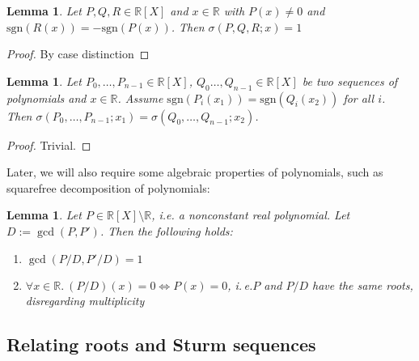 \documentclass[11pt,a4paper,oneside]{article}
\newtheorem{lemma}[definition]{Lemma}
\newcommand{\RR}{\mathbb{R}}
\newcommand{\sgn}{\mathrm{sgn}}
\newcommand{\ie}{i.\,e.\xspace}
\begin{document}
\begin{lemma}\label{thm:sign_changes_triple}
Let $P,Q,R\in\RR[X]$ and $x\in\RR$ with $P(x)\neq 0$ and $\sgn(R(x)) = -\sgn(P(x))$. Then $\sigma(P,Q,R; x) = 1$
\end{lemma}
\begin{proof}
By case distinction
\end{proof}\vskip3mm

\begin{lemma}\label{thm:same_signs}
Let $P_0,\ldots,P_{n-1}\in\RR[X]$, $Q_0\ldots,Q_{n-1}\in\RR[X]$ be two sequences of polynomials and $x\in\RR$. Assume $\sgn(P_i(x_1))=\sgn(Q_i(x_2))$ for all $i$. Then $\sigma(P_0,\ldots,P_{n-1};x_1)=\sigma(Q_0,\ldots,Q_{n-1};x_2)$.
\end{lemma}
\begin{proof}
Trivial.
\end{proof}\vskip3mm

Later, we will also require some algebraic properties of polynomials, such as squarefree decomposition of polynomials:
\begin{lemma}\label{thm:squarefree}
Let $P \in \RR[X]\setminus \RR$, i.e. a nonconstant real polynomial. Let $D:=\gcd(P,P')$. Then the following holds:
\begin{enumerate}
\item $\gcd(P/D, P'/D) = 1$
\item $\forall x\in\RR.\ (P/D)(x)=0 \Longleftrightarrow P(x)=0$, \ie $P$ and $P/D$ have the same roots, disregarding multiplicity
\end{enumerate}
\end{lemma}\vskip3mm


\subsection{Relating roots and Sturm sequences}
\label{sec:roots_sturm}
\end{document}
